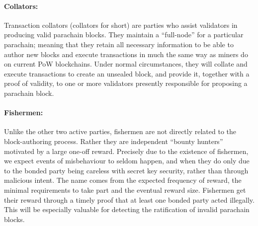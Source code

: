 \paragraph{Collators: }\label{par:collators} Transaction collators (collators for short) are parties who assist validators in producing valid parachain blocks. They maintain a “full-node” for a particular parachain; meaning that they retain all necessary information to be able to author new blocks and execute transactions in much the same way as miners do on current PoW blockchains. Under normal circumstances, they will collate and execute transactions to create an unsealed block, and provide it, together with a proof of validity, to one or more validators presently responsible for proposing a parachain block.
 

\paragraph{Fishermen:} \label{par:fishermen} Unlike the other two active parties, fishermen are not directly related to the block-authoring process. Rather they are independent “bounty hunters” motivated by a large one-off reward. Precisely due to the existence of fishermen, we expect events of misbehaviour to seldom happen, and when they do only due to the bonded party being careless with secret key security, rather than through malicious intent. The name comes from the expected frequency of reward, the minimal requirements to take part and the eventual reward size.
Fishermen get their reward through a timely proof that at least one bonded party acted illegally. This will be especially valuable for detecting the ratification of invalid parachain blocks.

